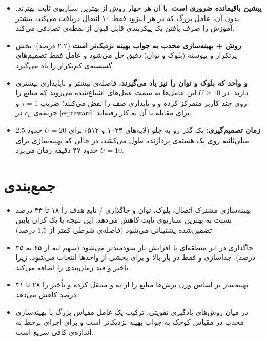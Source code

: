 \documentclass[12pt,oneside]{report}
\begin{document}
\begin{itemize}
	\item \textbf{پیشین باقیمانده ضروری است}: با آن هر چهار روش از بهترین سناریوی ثابت بهترند. بدون آن، عامل بزرگ که در هر اپیزود فقط ۱۰ انتقال دریافت می‌کند، بیشتر آموزش را صرف یافتن یک پیکربندی قابل قبول از نقطه‌ی تصادفی می‌کند.
	\item \textbf{روش  + بهینه‌سازی محدب به جواب بهینه نزدیک‌تر است} (۲.۲ درصد): بخش پرتکرار و پیوسته (بلوک و توان) دقیق حل می‌شود و عامل فقط تصمیم‌های گسسته‌ی کم‌تکرار را یاد می‌گیرد.
	\item \textbf{ و  واحد که بلوک و توان را نیز یاد می‌گیرند}، فاصله‌ی بیشتر و ناپایداری بیشتری دارند. در $U\ge10$ این عامل‌ها به سمت عمل‌های اشباع‌شده می‌روند که منابع را روی چند کاربر متمرکز کرده و  و پایداری صف را نقض می‌کنند؛ ضریب $\tau=1$ و جریمه‌ی $c_a$ در \eqref{eq:reward} برای مقابله با آن به کار رفته‌اند. %
	\item \textbf{زمان تصمیم‌گیری:} یک گذر رو به جلو  (لایه‌های ۱۰۲۴ و ۵۱۲) برای $U=20$ حدود $2.5$ میلی‌ثانیه روی یک هسته‌ی پردازنده طول می‌کشد، در حالی که بهینه‌سازی برای $U=10$ حدود ۴۷ دقیقه زمان می‌برد.
\end{itemize}

\section{جمع‌بندی}\label{sec:summary}
\begin{itemize}
	\item بهینه‌سازی مشترک اتصال، بلوک، توان و جاگذاری / تابع هدف را ۱۸ تا ۳۳ درصد نسبت به بهترین سناریوی ثابت کاهش می‌دهد. این نتیجه با یک کران پایین تضمین‌شده پشتیبانی می‌شود (فاصله‌ی شرطی کمتر از $1.5$ درصد).
	\item جاگذاری در ابر منطقه‌ای با افزایش بار سودمندتر می‌شود (سهم لبه از ۶۵ به ۳۵ درصد). جداسازی  و  فقط در بار بالا و برای بخشی از واحدها انتخاب می‌شود، زیرا تأخیر  و قید زمان‌بندی را اضافه می‌کند.
	\item بهینه‌ساز بر اساس وزن برش‌ها منابع را از  به  و  منتقل کرده و تأخیر  را ۲۸ تا ۴۱ درصد کاهش می‌دهد.
	\item در میان روش‌های یادگیری تقویتی، ترکیب یک عامل مقیاس بزرگ با بهینه‌سازی محدب در مقیاس کوچک به جواب بهینه نزدیک‌تر است و برای اجرای برخط به اندازه‌ی کافی سریع است. %
\end{itemize}
\end{document}
